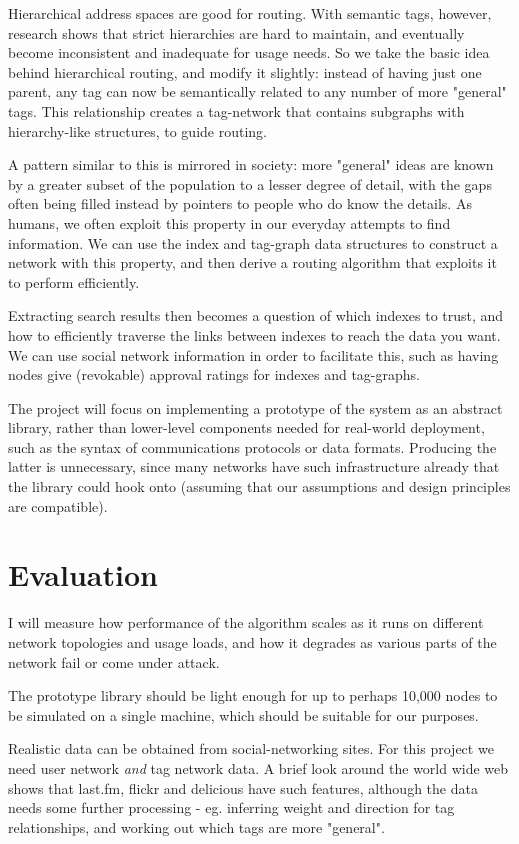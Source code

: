 \documentclass[12pt]{article}
\begin{document}
Hierarchical address spaces are good for routing. With semantic tags, however,
research shows that strict hierarchies are hard to maintain, and eventually
become inconsistent and inadequate for usage needs. So we take the basic idea
behind hierarchical routing, and modify it slightly: instead of having just one
parent, any tag can now be semantically related to any number of more "general"
tags. This relationship creates a tag-network that contains subgraphs with
hierarchy-like structures, to guide routing.

A pattern similar to this is mirrored in society: more "general" ideas are
known by a greater subset of the population to a lesser degree of detail, with
the gaps often being filled instead by pointers to people who do know the
details. As humans, we often exploit this property in our everyday attempts to
find information. We can use the index and tag-graph data structures to
construct a network with this property, and then derive a routing algorithm
that exploits it to perform efficiently.

Extracting search results then becomes a question of which indexes to trust,
and how to efficiently traverse the links between indexes to reach the data you
want. We can use social network information in order to facilitate this, such
as having nodes give (revokable) approval ratings for indexes and tag-graphs.

The project will focus on implementing a prototype of the system as an abstract
library, rather than lower-level components needed for real-world deployment,
such as the syntax of communications protocols or data formats. Producing the
latter is unnecessary, since many networks have such infrastructure already
that the library could hook onto (assuming that our assumptions and design
principles are compatible).


\section*{Evaluation}

I will measure how performance of the algorithm scales as it runs on different
network topologies and usage loads, and how it degrades as various parts of the
network fail or come under attack.

The prototype library should be light enough for up to perhaps 10,000 nodes to
be simulated on a single machine, which should be suitable for our purposes.

Realistic data can be obtained from social-networking sites. For this project
we need user network {\em and} tag network data. A brief look around the world
wide web shows that last.fm, flickr and delicious have such features, although
the data needs some further processing - eg. inferring weight and direction for
tag relationships, and working out which tags are more "general".
\end{document}
